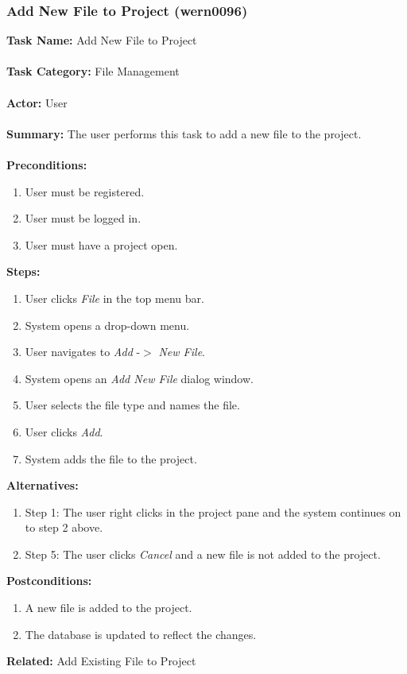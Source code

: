 \documentclass[11pt]{report}
\begin{document}
\subsubsection{Add New File to Project (wern0096)}
\begin{framed}
	\noindent\textbf{Task Name:} Add New File to Project \\ \\
	\textbf{Task Category:} File Management \\ \\
	\textbf{Actor:} User \\ \\
	\textbf{Summary:} The user performs this task to add a new file to the project. \\ \\
	\textbf{Preconditions:} 
	\begin{enumerate}
		\item User must be registered.
		\item User must be logged in.
		\item User must have a project open.
	\end{enumerate}
	\textbf{Steps:}
	\begin{enumerate}
		\item User clicks \textit{File} in the top menu bar.
		\item System opens a drop-down menu.
		\item User navigates to \textit{Add} -$>$ \textit{New File}.
		\item System opens an \textit{Add New File} dialog window.
		\item User selects the file type and names the file.
		\item User clicks \textit{Add}.
		\item System adds the file to the project.
	\end{enumerate}
	\textbf{Alternatives:} 
	\begin{enumerate}
		\item Step 1: The user right clicks in the project pane and the system continues on to step 2 above.
		\item Step 5: The user clicks \textit{Cancel} and a new file is not added to the project.
	\end{enumerate}
	\textbf{Postconditions:}
	\begin{enumerate}
		\item A new file is added to the project.
		\item The database is updated to reflect the changes.
	\end{enumerate}
	\textbf{Related:} Add Existing File to Project
\end{framed} 
\end{document}

